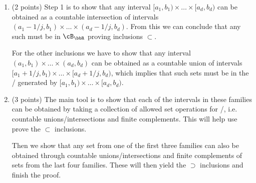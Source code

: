 \begin{enumerate}[label=(\alph*)]
For the other inclusion we consider a set $I := (a_1,b_1) \times \dots \times (a_d, b_d)$ with $a_i < b_i \in \bbQ$. Then by 6 we have that $I = \bigcup_{j \in \bbN} (a_1,b_1-1/j] \times \dots \times (a_d, b_d-1/j]$ where the later is a countable union of sets $(a_1,c_1] \times \dots \times [a_d,c_d]$ with $a_i < c_i \in \bbQ$ which must be in $\sigma(\cA_2)$ by definition of a \sigalg/. Hence, any such interval $I \in \sigma(\cA_2)$ and we thus conclude, using 3, that
\[
	\cB_\bbR = \sigma(\cA_1) \subset \sigma(\cA_2) \subset \sigma(\cA_2^\prime) \subset \sigma(\cA_1^\prime) = \cB_\bbR,
\]
which implies the result.
\item (2 points) Step 1 is to show that any interval $[a_1,b_1) \times \dots \times [a_d,b_d)$ can be obtained as a countable intersection of intervals $(a_1-1/j,b_1) \times \dots \times (a_d-1/j, b_d)$. From this we can conclude that any such must be in $\cB_\bbR$ proving inclusions $\subset$.

For the other inclusions we have to show that any interval $(a_1,b_1) \times \dots \times (a_d, b_d)$ can be obtained as a countable union of intervals $[a_1+1/j, b_1) \times \dots \times [a_d+1/j, b_d)$, which implies that such sets must be in the \sigalg/ generated by $[a_1,b_1) \times \dots \times [a_d, b_d)$. 
\item (3 points) The main tool is to show that each of the intervals in these families can be obtained by taking a collection of allowed set operations for \sigalgs/, i.e. countable unions/intersections and finite complements. This will help use prove the $\subset$ inclusions. 

Then we show that any set from one of the first three families can also be obtained through countable unions/intersections and finite complements of sets from the last four families. These will then yield the $\supset$ inclusions and finish the proof.
\end{enumerate}

